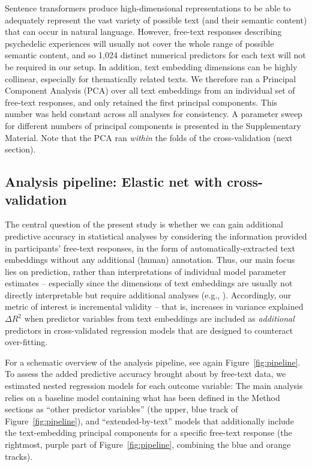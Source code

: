 \documentclass[man,floatsintext]{apa7}
\newcommand{\change}[1]{#1}
\begin{document}
Sentence transformers produce high-dimensional representations to be able to adequately represent the vast variety of possible text (and their semantic content) that can occur in natural language. However, free-text responses describing psychedelic experiences will usually not cover the whole range of possible semantic content, and so 1,024 distinct numerical predictors for each text will not be required in our setup. In addition, text embedding dimensions can be highly collinear, especially for thematically related texts. We therefore ran a Principal Component Analysis (PCA) over all text embeddings from an individual set of free-text responses, and only retained the  first principal components. This number was held constant across all analyses for consistency. A parameter sweep for different numbers of principal components is presented in the Supplementary Material. \change{Note that the PCA ran \emph{within} the folds of the cross-validation (next section).}


\subsection{\change{Analysis pipeline: Elastic net with cross-validation}}

The central question of the present study is whether we can gain additional predictive accuracy in statistical analyses by considering  the information provided in participants' free-text responses, in the form of automatically-extracted text embeddings without any additional (human) annotation. Thus, our main focus  lies on prediction, rather than interpretations of individual model parameter estimates \parencite{yarkoni2017choosing,shmueli2010explain} -- especially since the dimensions of text embeddings are usually not directly interpretable but require additional analyses (e.g., \cite{kjell2023text,Kjell2019}). Accordingly, our metric of interest is incremental validity -- that is, increases in variance explained $\Delta R^2$ when predictor variables from text embeddings are included as \emph{additional} predictors in cross-validated regression models that are designed to counteract over-fitting.    


For a schematic overview of the analysis pipeline, see again Figure~\ref{fig:pipeline}. To assess the added predictive accuracy brought about by free-text data, we estimated nested regression models for each outcome variable: The main analysis relies on a baseline model containing what has been defined in the Method sections as ``other predictor variables'' (the upper, blue track of Figure~\ref{fig:pipeline}), and ``extended-by-text'' models that additionally include the  text-embedding principal components for a specific free-text response (the rightmost, purple part of Figure~\ref{fig:pipeline}, combining the blue and orange tracks). 
\end{document}
